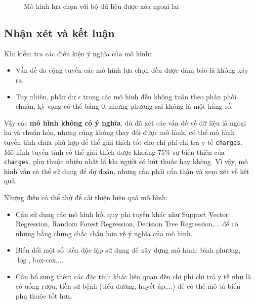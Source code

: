\begin{figure}[H]
	\centering
	\hfill
	\caption{Mô hình lựa chọn với bộ dữ liệu được xóa ngoại lai}
	\label{fig-a1:new-model-full}
\end{figure}

\subsection*{Nhận xét và kết luận}

Khi kiểm tra các điều kiện ý nghĩa của mô hình:
\begin{itemize}
	\item Vấn đề đa cộng tuyến các mô hình lựa chọn đều được đảm bảo là không xảy ra.
	\item Tuy nhiên, phần dư $\epsilon$ trong các mô hình đều không tuân theo phân phối chuẩn, kỳ vọng có thể bằng 0, nhưng phương sai không là một hằng số.
\end{itemize}

Vậy các \textbf{mô hình không có ý nghĩa}, dù đã xét các vấn đề về dữ liệu là ngoại lai và chuẩn hóa, nhưng cũng không thay đổi được mô hình, có thể mô hình tuyến tính chưa phù hợp để thể giải thích tốt cho chi phí chi trả y tế \texttt{charges}. Mô hình tuyến tính có thể giải thích được khoảng 75\% sự biến thiên của \texttt{charges}, phụ thuộc nhiều nhất là khi người có hút thuốc hay không. Vì vậy, mô hình vẫn có thể sử dụng để dự đoán, nhưng cần phải cẩn thận và xem xét về kết quả.

Những điều có thể thử để cải thiện hiệu quả mô hình:
\begin{itemize}
	\item Cần sử dụng các mô hình hồi quy phi tuyến khác như Support Vector Regression, Random Forest Regression, Decision Tree Regression,... để có những bằng chứng chắc chắn hơn về ý nghĩa của mô hình.
	\item Biến đổi một số biến độc lập sử dụng để xây dựng mô hình: bình phương, $\log$, box-cox,...
	\item Cần bổ sung thêm các đặc tính khác liên quan đến chi phí chi trả y tế như là có uống rượu, tiền sử bệnh (tiểu đường, huyết áp,...) để có thể mô tả biến phụ thuộc tốt hơn.
\end{itemize}
